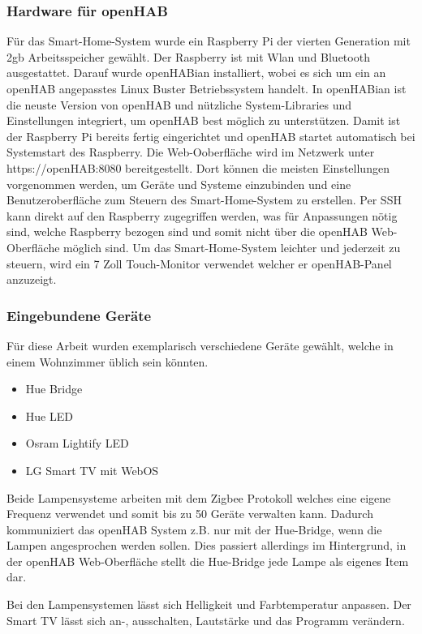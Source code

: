 	\subsubsection{Hardware für openHAB}
		Für das Smart-Home-System wurde ein Raspberry Pi der vierten Generation mit 2gb Arbeitsspeicher gewählt. Der Raspberry ist mit Wlan und Bluetooth ausgestattet. Darauf wurde openHABian installiert, wobei es sich um ein an openHAB angepasstes Linux Buster Betriebssystem handelt. In openHABian ist die neuste Version von openHAB und nützliche System-Libraries und Einstellungen integriert, um openHAB best möglich zu unterstützen. Damit ist der Raspberry Pi bereits fertig eingerichtet und openHAB startet automatisch bei Systemstart des Raspberry. Die Web-Ooberfläche wird im Netzwerk unter https://openHAB:8080 bereitgestellt. Dort können die meisten Einstellungen vorgenommen werden, um Geräte und Systeme einzubinden und eine Benutzeroberfläche zum Steuern des Smart-Home-System zu erstellen. Per SSH kann direkt auf den Raspberry zugegriffen werden, was für Anpassungen nötig sind, welche Raspberry bezogen sind und somit nicht über die openHAB Web-Oberfläche möglich sind.
		Um das Smart-Home-System leichter und jederzeit zu steuern, wird ein 7 Zoll Touch-Monitor verwendet welcher er openHAB-Panel anzuzeigt.
		
	\subsubsection{Eingebundene Geräte}
		Für diese Arbeit wurden exemplarisch verschiedene Geräte gewählt, welche in einem Wohnzimmer üblich sein könnten.
		\begin{itemize}
			\item Hue Bridge
			\item Hue LED
			\item Osram Lightify LED
			\item LG Smart TV mit WebOS
		\end{itemize}
		Beide Lampensysteme arbeiten mit dem Zigbee Protokoll welches eine eigene Frequenz verwendet und somit bis zu 50 Geräte verwalten kann. Dadurch kommuniziert das openHAB System z.B. nur mit der Hue-Bridge, wenn die Lampen angesprochen werden sollen. Dies passiert allerdings im Hintergrund, in der openHAB Web-Oberfläche stellt die Hue-Bridge jede Lampe als eigenes Item dar.
		
		Bei den Lampensystemen lässt sich Helligkeit und Farbtemperatur anpassen. Der Smart TV lässt sich an-, ausschalten, Lautstärke und das Programm verändern.
		
